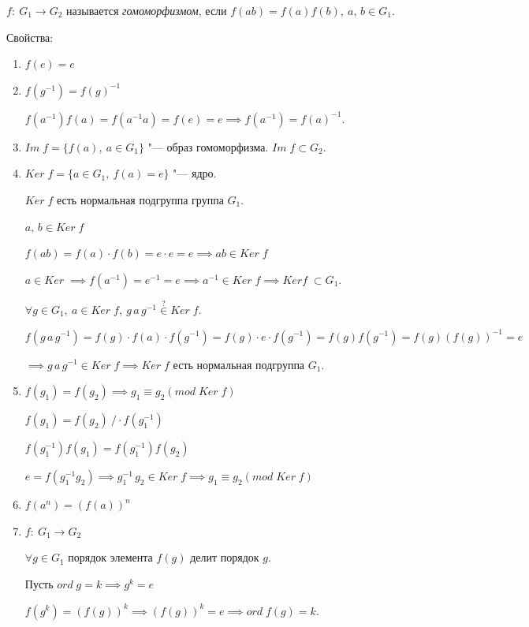 \begin{definition}
  $f:~ G_1 \to G_2$ называется \textit{гомоморфизмом}, если $f(ab) = f(a)f(b),~ a,\,b \in G_1$.
\end{definition}
Свойства:
\begin{enumerate}
  \item $f(e) = e$
  \item $f(g^{-1}) = f(g)^{-1}$
  \begin{Proof}
    $f(a^{-1})f(a) = f(a^{-1}a) = f(e) = e \implies f(a^{-1}) = f(a)^{-1}$.
  \end{Proof}
  \item $Im\;f = \{f(a),~ a \in G_1\}$ "--- образ гомоморфизма. $Im\;f\subset G_2$.
  \item $Ker\;f = \{a \in G_1,~ f(a) = e\}$ "--- ядро.
  
  $Ker\;f$ есть нормальная подгруппа группа $G_1$.
  \begin{Proof}
    $a,\, b \in Ker\;f$

    $f(ab) = f(a) \cdot f(b) = e \cdot e = e \implies ab \in Ker\; f$

    $a \in Ker\; \implies f(a^{-1}) = e^{-1} = e \implies a^{-1} \in Ker\;f \implies Ker f\; \subset G_1$.

    $\forall g \in G_1,~a \in Ker\; f,~ g\,a\,g^{-1} \stackrel{?}{\in} Ker\;f$.

    $f(g\,a\,g^{-1}) = f(g)\cdot f(a)\cdot f(g^{-1}) = f(g)\cdot e \cdot f(g^{-1}) = f(g)f(g^{-1}) = f(g)(f(g))^{-1}= e$
    
    $\implies g\,a\,g^{-1} \in Ker\;f \implies Ker\; f$ есть нормальная подгруппа $G_1$.
  \end{Proof}
  \item $f(g_1) = f(g_2) \implies g_1 \equiv g_2 (mod\; Ker\;f)$
  \begin{Proof}
    $f(g_1) = f(g_2) ~/ \cdot f(g_1^{-1})$

    $f(g_1^{-1}) f(g_1) = f(g_1^{-1})f(g_2)$

    $e = f(g_1^{-1}g_2) \implies g_1^{-1}\,g_2 \in Ker\;f \implies g_1 \equiv g_2 (mod\; Ker\;f)$
  \end{Proof}
  \item $f(a^n) = (f(a))^n$
  \item $f:~ G_1 \to G_2$
  
  $\forall g \in G_1$ порядок элемента $f(g)$ делит порядок $g$.
  \begin{Proof}
    Пусть $ord\; g = k \implies g^k = e$

    $f(g^k) =  (f(g))^k \implies (f(g))^k = e \implies ord\;f(g) = k$.
  \end{Proof}
\end{enumerate}